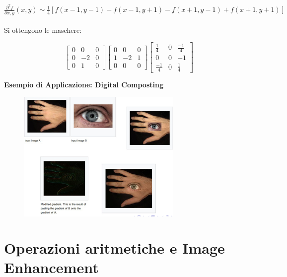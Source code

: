 $\frac{\partial^2{f}}{\partial{x,y}}(x,y) \sim \frac{1}{4}[f(x-1,y-1)-f(x-1,y+1)-f(x+1,y-1)+f(x+1, y+1)]$
\\\\Si ottengono le maschere:
\begin{center}
    \[
        \begin{bmatrix}
            0 & 0  & 0 \\
            0 & -2 & 0 \\
            0 & 1  & 0
        \end{bmatrix}
        \begin{bmatrix}
            0 & 0  & 0 \\
            1 & -2 & 1 \\
            0 & 0  & 0
        \end{bmatrix}
        \begin{bmatrix}
            \frac{1}{4}  & 0 & \frac{-1}{4} \\
            0            & 0 & -1           \\
            \frac{-1}{4} & 0 & \frac{1}{4}
        \end{bmatrix}
    \]
\end{center}

\textbf{Esempio di Applicazione: Digital Composting}
\begin{figure}[H]
    \centering
    \includegraphics[width=\linewidth, keepaspectratio]{capitoli/immagini/imgs/digital-composing.png}
\end{figure}

\section{Operazioni aritmetiche e Image Enhancement}


